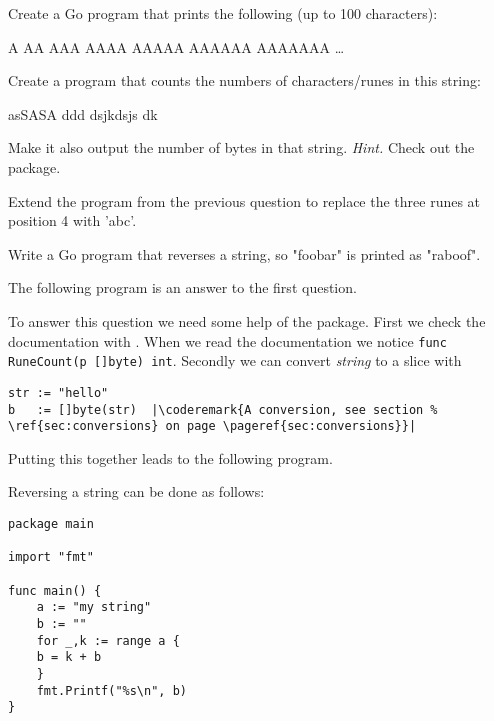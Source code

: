\begin{Exercise}[title={Strings},difficulty=1]
\label{ex:strings}
\Question \label{ex:strings q1} Create a Go program that prints
the following (up to 100 characters):
\begin{display}
A
AA
AAA
AAAA
AAAAA
AAAAAA
AAAAAAA
\ldots
\end{display}


\Question \label{ex:strings q2} Create a program that counts
the numbers of characters/runes in this string:
\begin{display}
asSASA ddd dsjkdsjs dk
\end{display}
Make it also output the number of bytes in that string.
\emph{Hint.} Check out the  package.

\Question \label{ex:string q3} Extend the program from
the previous question to replace the three runes at
position 4 with 'abc'.

\Question \label{ex:string q4} Write a Go program
that reverses a string, so "foobar" is printed as "raboof".

\end{Exercise}

\begin{Answer}

\Question The following program is an answer to the first question.


\Question To answer this question we need some help of
the  package. First we check the documentation
with . When we read the documentation
we notice \lstinline{func RuneCount(p []byte) int}. Secondly
we can convert \emph{string} to a  slice with
\begin{lstlisting}
str := "hello"
b   := []byte(str)  |\coderemark{A conversion, see section %
\ref{sec:conversions} on page \pageref{sec:conversions}}|
\end{lstlisting}

Putting this together leads to the following program.


\Question Reversing a string can be done as follows:
\begin{lstlisting}
package main

import "fmt"

func main() {
    a := "my string"
    b := ""
    for _,k := range a {
	b = k + b
    }
    fmt.Printf("%s\n", b)
}
\end{lstlisting}

\end{Answer}
